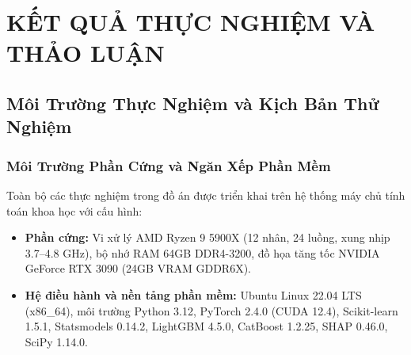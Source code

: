 \chapter{KẾT QUẢ THỰC NGHIỆM VÀ THẢO LUẬN}
\label{ch:experimental_results}

\section{Môi Trường Thực Nghiệm và Kịch Bản Thử Nghiệm}
\label{sec:experimental_setup}

\subsection{Môi Trường Phần Cứng và Ngăn Xếp Phần Mềm}
Toàn bộ các thực nghiệm trong đồ án được triển khai trên hệ thống máy chủ tính toán khoa học với cấu hình:
\begin{itemize}
    \item \textbf{Phần cứng:} Vi xử lý AMD Ryzen 9 5900X (12 nhân, 24 luồng, xung nhịp 3.7--4.8 GHz), bộ nhớ RAM 64GB DDR4-3200, đồ họa tăng tốc NVIDIA GeForce RTX 3090 (24GB VRAM GDDR6X).
    \item \textbf{Hệ điều hành và nền tảng phần mềm:} Ubuntu Linux 22.04 LTS (x86\_64), môi trường Python 3.12, PyTorch 2.4.0 (CUDA 12.4), Scikit-learn 1.5.1, Statsmodels 0.14.2, LightGBM 4.5.0, CatBoost 1.2.25, SHAP 0.46.0, SciPy 1.14.0.
\end{itemize}

